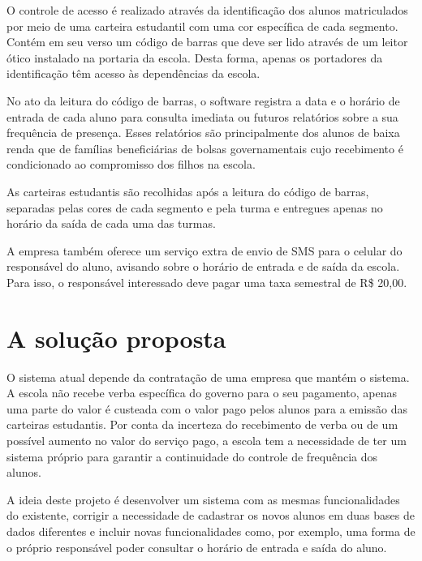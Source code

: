   O controle de acesso é realizado através da identificação dos alunos
  matriculados por meio de uma carteira estudantil com uma cor específica de
  cada segmento. Contém em seu verso um código de barras que deve ser lido
  através de um leitor ótico instalado na portaria da escola. Desta forma,
  apenas os portadores da identificação têm acesso às dependências da escola.

  No ato da leitura do código de barras, o software registra a data e o horário
  de entrada de cada aluno para consulta imediata ou futuros relatórios sobre a
  sua frequência de presença. Esses relatórios são principalmente dos alunos de
  baixa renda que de famílias beneficiárias de bolsas governamentais cujo
  recebimento é condicionado ao compromisso dos filhos na escola.

  As carteiras estudantis são recolhidas após a leitura do código de barras,
  separadas pelas cores de cada segmento e pela turma e entregues apenas no
  horário da saída de cada uma das turmas.

  A empresa também oferece um serviço extra de envio de SMS para o celular do
  responsável do aluno, avisando sobre o horário de entrada e de saída da
  escola. Para isso, o responsável interessado deve pagar uma taxa semestral de
  R\$ 20,00.

  \section{A solução proposta}

  O sistema atual depende da contratação de uma empresa que mantém o sistema. A
  escola não recebe verba específica do governo para o seu pagamento, apenas uma
  parte do valor é custeada com o valor pago pelos alunos para a emissão das
  carteiras estudantis. Por conta da incerteza do recebimento de verba ou de um
  possível aumento no valor do serviço pago, a escola tem a necessidade de ter
  um sistema próprio para garantir a continuidade do controle de frequência dos
  alunos.

  A ideia deste projeto é desenvolver um sistema com as mesmas funcionalidades
  do existente, corrigir a necessidade de cadastrar os novos alunos em duas
  bases de dados diferentes e incluir novas funcionalidades como, por exemplo,
  uma forma de o próprio responsável poder consultar o horário de entrada e
  saída do aluno.

